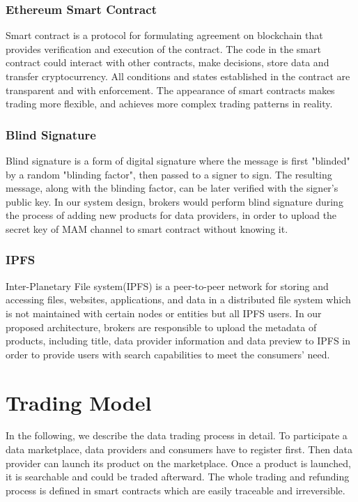 \documentclass[journal,10pt,a4paper]{IEEEtran}
\begin{document}
\subsubsection{Ethereum Smart Contract}
Smart contract\cite{smartContract} is a protocol for formulating agreement on blockchain that provides verification and execution of the contract. The code in the smart contract could interact with other contracts, make decisions, store data and transfer cryptocurrency. All conditions and states established in the contract are transparent and with enforcement. The appearance of smart contracts makes trading more flexible, and achieves more complex trading patterns in reality.

\subsubsection{Blind Signature}
Blind signature\cite{blindSig} is a form of digital signature where the message is first "blinded" by a random "blinding factor", then passed to a signer to sign. The resulting message, along with the blinding factor, can be later verified with the signer's public key. In our system design, brokers would perform blind signature during the process of adding new products for data providers, in order to upload the secret key of MAM channel to smart contract without knowing it.

\subsubsection{IPFS}
Inter-Planetary File system(IPFS)\cite{IPFS} is a peer-to-peer network for storing and accessing files, websites, applications, and data in a distributed file system which is not maintained with certain nodes or entities but all IPFS users. In our proposed architecture, brokers are responsible to upload the metadata of products, including title, data provider information and data preview to IPFS in order to provide users with search capabilities to meet the consumers' need.

\section{\normalsize\textbf{Trading Model}}
In the following, we describe the data trading process in detail. To participate a data marketplace, data providers and consumers have to register first. Then data provider can launch its product on the marketplace. Once a product is launched, it is searchable and could be traded afterward. The whole trading and refunding process is defined in smart contracts which are easily traceable and irreversible.
\end{document}

